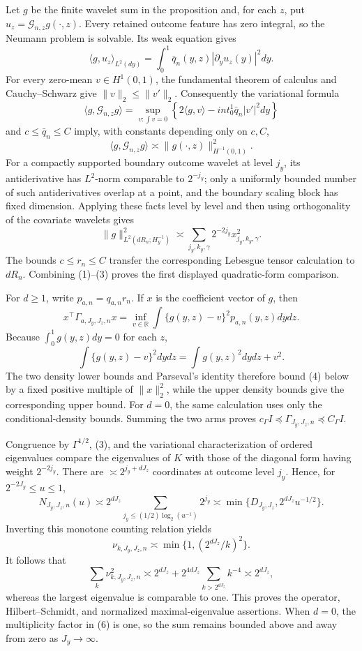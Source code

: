 Let \(g\) be the finite wavelet sum in the proposition and, for each \(z\), put \(u_z=\mathcal G_{n,z}g(\cdot,z)\).  Every retained outcome feature has zero integral, so the Neumann problem is solvable.  Its weak equation gives
\[
\langle g,u_z\rangle_{L^2(dy)}
=\int_0^1\bar q_n(y,z)|\partial_yu_z(y)|^2dy.                              \tag{1}
\]
For every zero-mean \(v\in H^1(0,1)\), the fundamental theorem of calculus and Cauchy--Schwarz give \(\|v\|_2\le\|v'\|_2\).  Consequently the variational formula
\[
\langle g,\mathcal G_{n,z}g\rangle
=\sup_{v:\int v=0}\left\{2\langle g,v\rangle-int_0^1\bar q_n|v'|^2dy\right\}
\]
and \(c\le\bar q_n\le C\) imply, with constants depending only on \(c,C\),
\[
\langle g,\mathcal G_{n,z}g\rangle
\asymp\|g(\cdot,z)\|_{H^{-1}(0,1)}^2.                                    \tag{2}
\]
For a compactly supported boundary outcome wavelet at level \(j_y\), its antiderivative has \(L^2\)-norm comparable to \(2^{-j_y}\); only a uniformly bounded number of such antiderivatives overlap at a point, and the boundary scaling block has fixed dimension.  Applying these facts level by level and then using orthogonality of the covariate wavelets gives
\[
\|g\|_{L^2(dR_n;H^{-1}_y)}^2
\asymp\sum_{j_y,k_y,\gamma}2^{-2j_y}x_{j_y,k_y,\gamma}^2.                  \tag{3}
\]
The bounds \(c\le r_n\le C\) transfer the corresponding Lebesgue tensor calculation to \(dR_n\).  Combining (1)--(3) proves the first displayed quadratic-form comparison.

For \(d\ge1\), write \(p_{a,n}=q_{a,n}r_n\).  If \(x\) is the coefficient vector of \(g\), then
\[
x^\top\Gamma_{a,J_y,J_z,n}x
=\inf_{v\in\mathbb R}\int\{g(y,z)-v\}^2p_{a,n}(y,z)dydz.                 \tag{4}
\]
Because \(\int_0^1g(y,z)dy=0\) for each \(z\),
\[
\int\{g(y,z)-v\}^2dydz=\int g(y,z)^2dydz+v^2.
\]
The two density lower bounds and Parseval's identity therefore bound (4) below by a fixed positive multiple of \(\|x\|_2^2\), while the upper density bounds give the corresponding upper bound.  For \(d=0\), the same calculation uses only the conditional-density bounds.  Summing the two arms proves \(c_\Gamma I\preceq\Gamma_{J_y,J_z,n}\preceq C_\Gamma I\).

Congruence by \(\Gamma^{1/2}\), (3), and the variational characterization of ordered eigenvalues compare the eigenvalues of \(K\) with those of the diagonal form having weight \(2^{-2j_y}\).  There are \(\asymp2^{j_y+dJ_z}\) coordinates at outcome level \(j_y\).  Hence, for \(2^{-2J_y}\le u\le1\),
\[
N_{J_y,J_z,n}(u)
\asymp2^{dJ_z}\sum_{j_y\le(1/2)\log_2(u^{-1})}2^{j_y}
\asymp\min\{D_{J_y,J_z},2^{dJ_z}u^{-1/2}\}.                              \tag{5}
\]
Inverting this monotone counting relation yields
\[
\nu_{k,J_y,J_z,n}\asymp\min\{1,(2^{dJ_z}/k)^2\}.
\]
It follows that
\[
\sum_k\nu_{k,J_y,J_z,n}^2
\asymp2^{dJ_z}+2^{4dJ_z}\sum_{k>2^{dJ_z}}k^{-4}
\asymp2^{dJ_z},                                                            \tag{6}
\]
whereas the largest eigenvalue is comparable to one.  This proves the operator, Hilbert--Schmidt, and normalized maximal-eigenvalue assertions.  When \(d=0\), the multiplicity factor in (6) is one, so the sum remains bounded above and away from zero as \(J_y\to\infty\).

